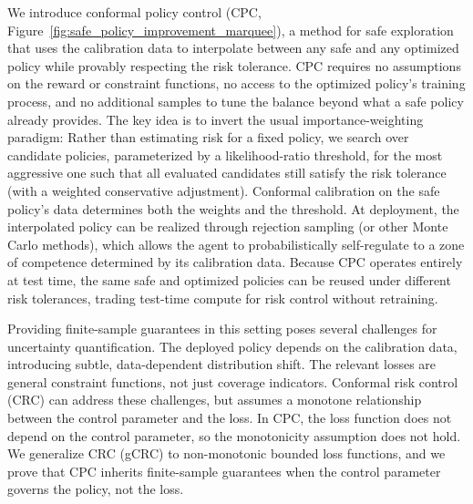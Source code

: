 We introduce conformal policy control (CPC, Figure~\ref{fig:safe_policy_improvement_marquee}), a method for safe exploration that uses the calibration data to interpolate between any safe and any optimized policy while provably respecting the risk tolerance. 
CPC requires no assumptions on the reward or constraint functions, no access to the optimized policy's training process, and no additional samples to tune the balance beyond what a safe policy already provides.
The key idea is to invert the usual importance-weighting paradigm: Rather than estimating risk for a fixed policy, we search over candidate policies, parameterized by a likelihood-ratio threshold, for the most aggressive one such that all evaluated candidates still satisfy the risk tolerance (with a weighted conservative adjustment). Conformal calibration on the safe policy's data determines both the weights and the threshold.
At deployment, the interpolated policy can be realized through rejection sampling (or other Monte Carlo methods), which allows the agent to probabilistically self-regulate to a zone of competence determined by its calibration data.
Because CPC operates entirely at test time, the same safe and optimized policies can be reused under different risk tolerances, trading test-time compute for risk control without retraining.

Providing finite-sample guarantees in this setting poses several challenges for uncertainty quantification. The deployed policy depends on the calibration data, introducing subtle, data-dependent distribution shift. 
The relevant losses are general constraint functions, not just coverage indicators. 
Conformal risk control (CRC) \citep{angelopoulos2022conformal} can address these challenges, but assumes a monotone relationship between the control parameter and the loss. In CPC, the loss function does not depend on the control parameter, so the monotonicity assumption does not hold. We generalize CRC (gCRC) to non-monotonic bounded loss functions, and we prove that CPC inherits finite-sample guarantees when the control parameter governs the policy, not the loss.

